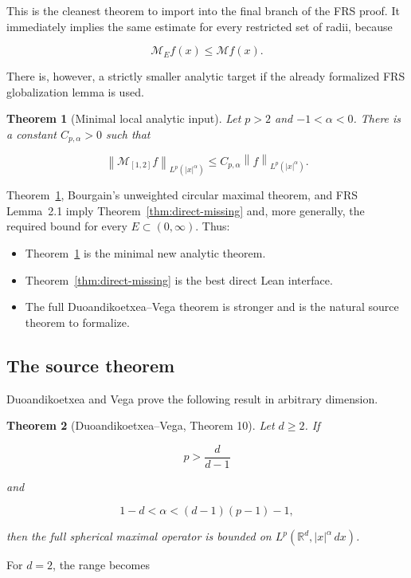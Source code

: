 \documentclass[11pt,a4paper]{article}
\newtheorem{theorem}{Theorem}[section]
\theoremstyle{definition}
\theoremstyle{remark}
\newcommand{\R}{\mathbb{R}}
\newcommand{\M}{\mathcal{M}}
\newcommand{\norm}[1]{\left\lVert #1\right\rVert}
\newcommand{\abs}[1]{\left\lvert #1\right\rvert}
\begin{document}
This is the cleanest theorem to import into the final branch of the FRS proof.
It immediately implies the same estimate for every restricted set of radii,
because

\[
\M_E f(x)\leq \M f(x).
\]

There is, however, a strictly smaller analytic target if the already formalized
FRS globalization lemma is used.

\begin{theorem}[Minimal local analytic input]\label{thm:minimal-local}
Let $p>2$ and $-1<\alpha<0$.  There is a constant $C_{p,\alpha}>0$ such that

\[
\norm{\M_{[1,2]} f}_{L^p(\abs{x}^{\alpha})}
\leq C_{p,\alpha}\norm{f}_{L^p(\abs{x}^{\alpha})}.
\]
\end{theorem}

Theorem~\ref{thm:minimal-local}, Bourgain's unweighted circular maximal theorem,
and FRS Lemma~2.1 imply Theorem~\ref{thm:direct-missing} and, more generally,
the required bound for every $E\subset(0,\infty)$.  Thus:

\begin{itemize}[leftmargin=7mm]
\item Theorem~\ref{thm:minimal-local} is the minimal new analytic theorem.
\item Theorem~\ref{thm:direct-missing} is the best direct Lean interface.
\item The full Duoandikoetxea--Vega theorem is stronger and is the natural
      source theorem to formalize.
\end{itemize}

\subsection{The source theorem}

Duoandikoetxea and Vega prove the following result in arbitrary dimension.

\begin{theorem}[Duoandikoetxea--Vega, Theorem 10]\label{thm:dv-general}
Let $d\geq2$.  If

\[
p>\frac{d}{d-1}
\]

and

\[
1-d<\alpha<(d-1)(p-1)-1,
\]

then the full spherical maximal operator is bounded on
$L^p(\R^d,\abs{x}^{\alpha}\,dx)$.
\end{theorem}

For $d=2$, the range becomes
\end{document}
